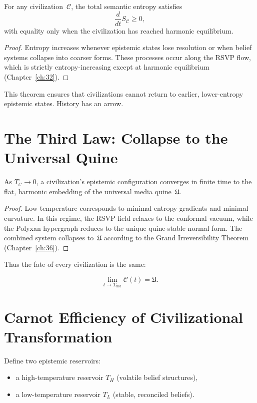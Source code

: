\begin{theorem}
For any civilization~$\mathcal{C}$, the total semantic entropy satisfies
\[
\frac{d}{dt} S_{\mathcal{C}} \ge 0,
\]
with equality only when the civilization has reached harmonic equilibrium.
\end{theorem}

\begin{proof}
Entropy increases whenever epistemic states lose resolution or when
belief systems collapse into coarser forms.  
These processes occur along the RSVP flow, which is strictly
entropy-increasing except at harmonic equilibrium (Chapter~\ref{ch:32}).
\end{proof}

This theorem ensures that civilizations cannot return to earlier,
lower-entropy epistemic states.  
History has an arrow.

\section{The Third Law: Collapse to the Universal Quine}

\begin{theorem}
As $T_{\mathcal{C}} \to 0$, a civilization’s epistemic configuration
converges in finite time to the flat, harmonic embedding of the
universal media quine~$\mathfrak{U}$.
\end{theorem}

\begin{proof}
Low temperature corresponds to minimal entropy gradients and minimal
curvature.  
In this regime, the RSVP field relaxes to the conformal vacuum, while
the Polyxan hypergraph reduces to the unique quine-stable normal form.
The combined system collapses to~$\mathfrak{U}$ according to the Grand
Irreversibility Theorem (Chapter~\ref{ch:36}).
\end{proof}

Thus the fate of every civilization is the same:

\[
\lim_{t\to T_{\mathrm{end}}} \mathcal{C}(t)
  = \mathfrak{U}.
\]

\section{Carnot Efficiency of Civilizational Transformation}

Define two epistemic reservoirs:

\begin{itemize}
\item a high-temperature reservoir $T_H$ (volatile belief structures),  
\item a low-temperature reservoir $T_L$ (stable, reconciled beliefs).
\end{itemize}

